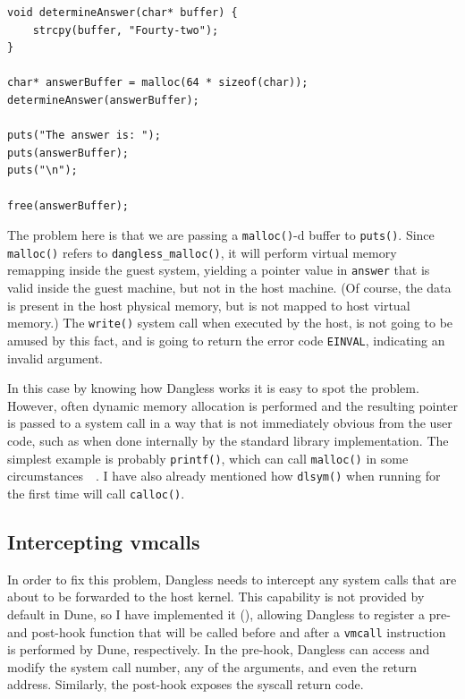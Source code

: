 \begin{lstlisting}
void determineAnswer(char* buffer) {
	strcpy(buffer, "Fourty-two");
}

char* answerBuffer = malloc(64 * sizeof(char));
determineAnswer(answerBuffer);

puts("The answer is: ");
puts(answerBuffer);
puts("\n");

free(answerBuffer);
\end{lstlisting}

The problem here is that we are passing a \lstinline!malloc()!-d buffer to \lstinline!puts()!. Since \lstinline!malloc()! refers to \lstinline!dangless_malloc()!, it will perform virtual memory remapping inside the guest system, yielding a pointer value in \lstinline!answer! that is valid inside the guest machine, but not in the host machine. (Of course, the data is present in the host physical memory, but is not mapped to host virtual memory.) The \lstinline!write()! system call when executed by the host, is not going to be amused by this fact, and is going to return the error code \texttt{EINVAL}, indicating an invalid argument.

In this case by knowing how Dangless works it is easy to spot the problem. However, often dynamic memory allocation is performed and the resulting pointer is passed to a system call in a way that is not immediately obvious from the user code, such as when done internally by the standard library implementation. The simplest example is probably \lstinline!printf()!, which can call \lstinline!malloc()! in some circumstances~\cite{glibc-printf-malloc}~\cite{glibc-printf-malloc-vulnerability}. I have also already mentioned how \lstinline!dlsym()! when running for the first time will call \lstinline!calloc()!.

\subsection{Intercepting vmcalls}

In order to fix this problem, Dangless needs to intercept any system calls that are about to be forwarded to the host kernel. This capability is not provided by default in Dune, so I have implemented it (), allowing Dangless to register a pre- and post-hook function that will be called before and after a \lstinline!vmcall! instruction is performed by Dune, respectively. In the pre-hook, Dangless can access and modify the system call number, any of the arguments, and even the return address. Similarly, the post-hook exposes the syscall return code.


